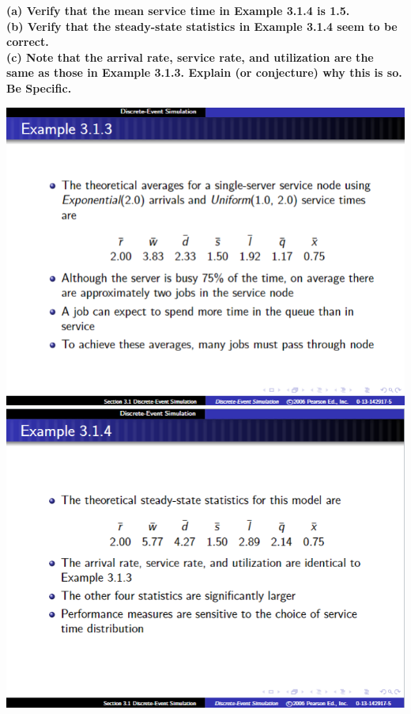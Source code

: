 \textbf{(a) Verify that the mean service time in Example 3.1.4 is 1.5.}\\
\textbf{(b) Verify that the steady-state statistics in Example 3.1.4 seem to be correct.}\\
\textbf{(c) Note that the arrival rate, service rate, and utilization are the same as those in Example 3.1.3. Explain (or conjecture) why this is so. Be Specific.}\\
\begin{center}
\includegraphics[scale=0.75]{Sections/Q2/3.1.3.png}\\
\vspace{10pt}
\includegraphics[scale=0.75]{Sections/Q2/3.1.4.png}\\
\end{center}
